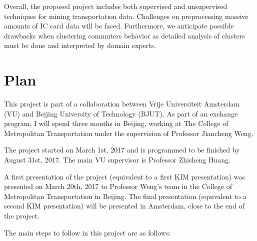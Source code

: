 \documentclass{article}
\begin{document}
Overall, the proposed project includes both supervised and unsupervised techniques for mining transportation data. Challenges on preprocessing massive amounts of IC card data will be faced. Furthermore, we anticipate possible drawbacks when clustering commuters behavior as detailed analysis of clusters must be done and interpreted by domain experts. 

\section{Plan}
This project is part of a collaboration between Vrije Universiteit Amsterdam (VU) and Beijing University of Technology (BJUT). As part of an exchange program, I will spend three months in Beijing, working at The College of Metropolitan Transportation under the supervision of Professor Jiancheng Weng. 

The project started on March 1st, 2017 and is programmed to be finished by August 31st, 2017. The main VU supervisor is Professor Zhisheng Huang. 

A first presentation of the project (equivalent to a first KIM presentation) was presented on March 20th, 2017 to Professor Weng's team in the College of Metropolitan Transportation in Beijing. The final presentation (equivalent to a second KIM presentation) will be presented in Amsterdam, close to the end of the project.

The main steps to follow in this project are as follows:
\end{document}
